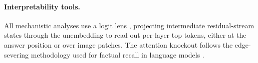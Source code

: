 \paragraph{Interpretability tools.} All mechanistic analyses use a logit lens
\citep{logitlens2020, tunedlens2023}, projecting intermediate residual-stream
states through the unembedding to read out per-layer top tokens, either at the
answer position or over image patches. The attention knockout follows the
edge-severing methodology used for factual recall in language models
\citep{attnknockout2023, rome2022}.
